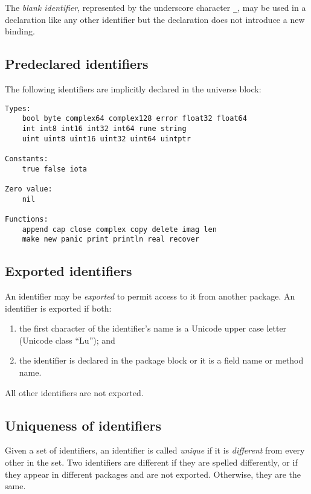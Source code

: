 The \emph{blank identifier}, represented by the underscore character
\texttt{\_}, may be used in a declaration like any other identifier but
the declaration does not introduce a new binding.

\subsection*{Predeclared identifiers}

The following identifiers are implicitly declared in the
universe block:

\begin{Verbatim}[frame=single]
Types:
    bool byte complex64 complex128 error float32 float64
    int int8 int16 int32 int64 rune string
    uint uint8 uint16 uint32 uint64 uintptr

Constants:
    true false iota

Zero value:
    nil

Functions:
    append cap close complex copy delete imag len
    make new panic print println real recover
\end{Verbatim}

\subsection*{Exported identifiers}

An identifier may be \emph{exported} to permit access to it from another
package. An identifier is exported if both:

\begin{enumerate}
\item
  the first character of the identifier's name is a Unicode upper case
  letter (Unicode class ``Lu''); and
\item
  the identifier is declared in the package block or
  it is a field name or
  method name.
\end{enumerate}

All other identifiers are not exported.

\subsection*{Uniqueness of identifiers}

Given a set of identifiers, an identifier is called \emph{unique} if it
is \emph{different} from every other in the set. Two identifiers are
different if they are spelled differently, or if they appear in
different packages and are not
exported. Otherwise, they are the
same.

